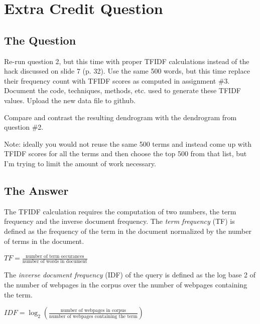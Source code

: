 \section{Extra Credit Question}

\subsection{The Question}

\begin{flushleft}

Re-run question 2, but this time with proper TFIDF calculations
instead of the hack discussed on slide 7 (p. 32).  Use the same 500
words, but this time replace their frequency count with TFIDF scores
as computed in assignment \#3.  Document the code, techniques,
methods, etc. used to generate these TFIDF values.  Upload the new
data file to github.

Compare and contrast the resulting dendrogram with the dendrogram
from question \#2.

Note: ideally you would not reuse the same 500 terms and instead
come up with TFIDF scores for all the terms and then choose the top
500 from that list, but I'm trying to limit the amount of work
necessary.

\end{flushleft}
\subsection{The Answer}


The TFIDF calculation requires the computation of two numbers, the term frequency and the inverse document frequency.
The {\sl term frequency} (TF) is defined as the frequency of the term in the document normalized by the number of terms in the document. 

\begin{center}
\Large
$TF = \frac{\text{number of term occurances}}{\text{number of words in document}}$
\end{center}

The {\sl inverse document frequency} (IDF) of the query is defined as the log base 2 of the number of webpages in the corpus over the number of webpages containing the term. 




\begin{center}
\Large
$IDF =\log_{2} (\frac{\text{number of webpages in corpus}}{\text{number of webpages containing the term}})$
\end{center}


